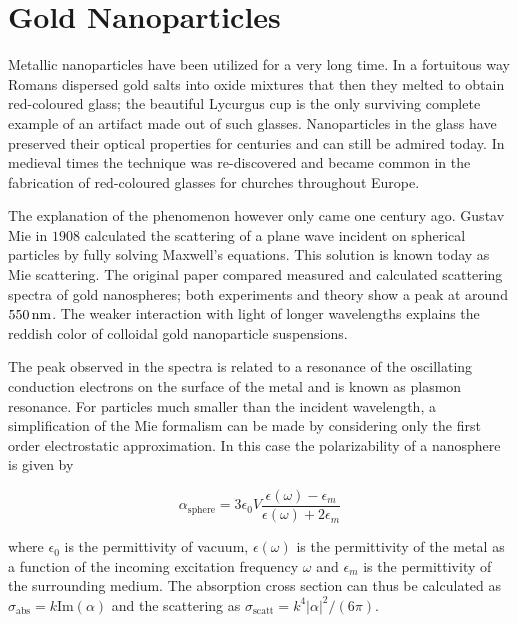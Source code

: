 \section{Gold Nanoparticles}
Metallic nanoparticles have been utilized for a very long time. In a fortuitous
way Romans dispersed gold salts into oxide mixtures that then they melted to
obtain red-coloured glass; the beautiful Lycurgus
cup\cite{barber1990investigation} is the only surviving complete example of an
artifact made out of such glasses. Nanoparticles in the glass have preserved
their optical properties for centuries and can still be admired today. In
medieval times the technique was re-discovered and became common in the
fabrication of red-coloured glasses for churches throughout Europe. 

The explanation of the phenomenon however only came one century ago. Gustav Mie
in $1908$ calculated the scattering of a plane wave incident on spherical
particles\cite{mie1908beitrage} by fully solving Maxwell's equations.
This solution is known today as Mie scattering. The original paper compared
measured and calculated scattering spectra of gold nanospheres; both experiments
and theory show a peak at around $550\,\textrm{nm}$. The weaker interaction with light of
longer wavelengths explains the reddish color of colloidal gold nanoparticle
suspensions.

The peak observed in the spectra is related to a resonance of the oscillating
conduction electrons on the surface of the metal and is known as plasmon
resonance. For particles much smaller than the incident wavelength, a
simplification of the Mie formalism can be made by considering only the first
order electrostatic approximation. In this case the polarizability of a
nanosphere is given by\cite{bohren2008absorption}

\begin{equation}\label{eqn:polarizability}
	\alpha_{\textrm{sphere}} =
	3\epsilon_0V\frac{\epsilon(\omega)-\epsilon_m}{\epsilon(\omega)+2\epsilon_m}
\end{equation}

\noindent where $\epsilon_0$ is the permittivity of vacuum, $\epsilon(\omega)$
is the permittivity of the metal as a function of the incoming excitation
frequency $\omega$ and $\epsilon_m$ is the permittivity of the surrounding medium. The absorption
cross section can thus be calculated as
$\sigma_\textrm{abs}=k\textrm{Im}(\alpha)$ and the scattering as
$\sigma_\textrm{scatt}=k^4|\alpha|^2/(6\pi)$.

